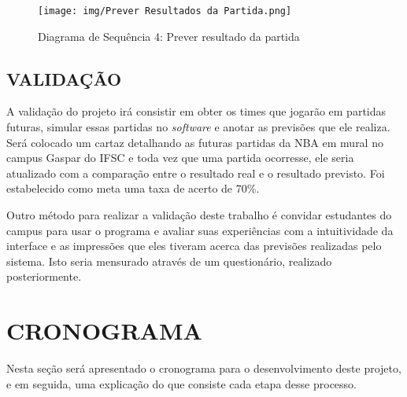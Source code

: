 \documentclass[brazilian]{ifsc-tcc}
\begin{document}
\begin{figure}[H]
    \centering
    \caption{Diagrama de Sequência 4: Prever resultado da partida}
    \texttt{[image: img/Prever Resultados da Partida.png]}
    \label{fig:diagrama-sequencia-prever-jogo}
\end{figure}

\section{VALIDAÇÃO}
A validação do projeto irá consistir em obter os times que jogarão em partidas futuras, simular essas partidas no \textit{software} e anotar as previsões que ele realiza. Será colocado um cartaz detalhando as futuras partidas da NBA em mural no campus Gaspar do IFSC e toda vez que uma partida ocorresse, ele seria atualizado com a comparação entre o resultado real e o resultado previsto. Foi estabelecido como meta uma taxa de acerto de 70\%.

Outro método para realizar a validação deste trabalho é convidar estudantes do campus para usar o programa e avaliar suas experiências com a intuitividade da interface e as impressões que eles tiveram acerca das previsões realizadas pelo sistema. Isto seria mensurado através de um questionário, realizado posteriormente.

\chapter{CRONOGRAMA}

Nesta seção será apresentado o cronograma para o desenvolvimento deste projeto, e em seguida, uma explicação do que consiste cada etapa desse processo.
\end{document}
